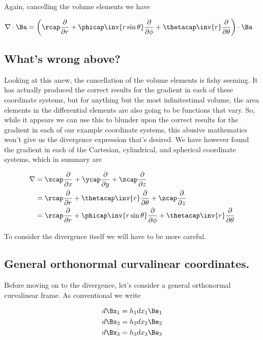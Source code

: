 Again, cancelling the volume elements we have

\begin{align}\label{eqn:sphericalGradDot}
\grad \cdot \Ba &=
\left(\rcap \PD{r}{}
+\phicap \inv{r \sin\theta} \PD{\phi}{}
+\thetacap \inv{r} \PD{\theta}{}
\right) \cdot \Ba
\end{align}

\subsection{What's wrong above?}

Looking at this anew, the cancellation of the volume elements is fishy seeming.  It has actually produced the correct results for the gradient in each of these coordinate systems, but for anything but the most infinitestimal volume, the area elements in the differential elements are also going to be functions that vary.  So, while it appears we can use this to blunder upon the correct results for the gradient in each of our example coordinate systems, this abusive mathematics won't give us the divergence expression that's desired.  We have however found the gradient in each of the Cartesian, cylindrical, and spherical coordinate systems, which in summary are

\begin{align}\label{eqn:gradientExampleSummary}
\grad
&= \xcap \PD{x}{} +\ycap \PD{y}{} +\zcap \PD{z}{} \\
&= \rcap \PD{r}{} +\thetacap \inv{r} \PD{\theta}{} + \zcap \PD{z}{} \\
&= \rcap \PD{r}{} +\phicap \inv{r \sin\theta} \PD{\phi}{} +\thetacap \inv{r} \PD{\theta}{}
\end{align}

To consider the divergence itself we will have to be more careful.

\subsection{General orthonormal curvalinear coordinates.}

Before moving on to the divergence, let's consider a general orthonormal curvalinear frame.  As conventional we write

\begin{align*}
d\Bx_1 &= h_1 dx_1 \Be_1 \\
d\Bx_2 &= h_2 dx_2 \Be_2 \\
d\Bx_3 &= h_3 dx_3 \Be_3
\end{align*}

